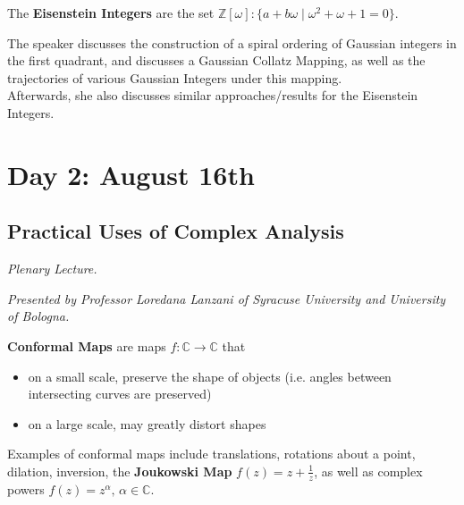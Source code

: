 \documentclass[12pt]{amsart}
\begin{document}
\begin{definition}
The \textbf{Eisenstein Integers} are the set $\mathbb{Z}[\omega] : \{ a + b\omega \mid \omega^2 + \omega + 1 = 0 \}.$ \\
\end{definition}

\begin{result*}
The speaker discusses the construction of a spiral ordering of Gaussian integers in the first quadrant, and discusses a Gaussian Collatz Mapping, as well as the trajectories of various Gaussian Integers under this mapping. \\

Afterwards, she also discusses similar approaches/results for the Eisenstein Integers.
\end{result*}

\newpage

\section{Day 2: August 16th}

\subsection{Practical Uses of Complex Analysis}

\textit{Plenary Lecture.}
\vspace{0.25cm}

\textit{Presented by Professor Loredana Lanzani of Syracuse University and University of Bologna.}

\begin{definition}
\textbf{Conformal Maps} are maps $f: \mathbb{C} \rightarrow \mathbb{C}$ that
\begin{itemize}
    \item on a small scale, preserve the shape of objects (i.e. angles between intersecting curves are preserved) 
    \item on a large scale, may greatly distort shapes
\end{itemize}

\end{definition}

\vspace{0.25cm}
Examples of conformal maps include translations, rotations about a point, dilation, inversion, the \textbf{Joukowski Map} $f(z) = z + \frac{1}{z}$, as well as complex powers $f(z) = z^\alpha, \, \alpha \in \mathbb{C}.$ \\
\end{document}
